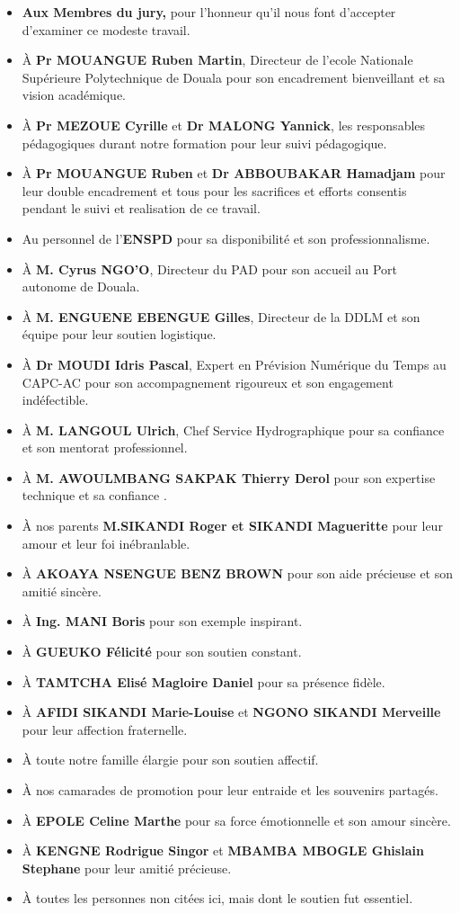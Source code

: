 \documentclass[a4paper,12pt,openany]{report}
\begin{document}
  \begin{itemize}
   
	\item \textbf{Aux Membres du jury,} pour l'honneur qu'il nous font d'accepter d'examiner ce modeste travail.  
	\item À \textbf{Pr MOUANGUE Ruben Martin}, Directeur de l'ecole Nationale Supérieure Polytechnique de Douala pour son encadrement bienveillant et sa vision académique.  
	\item À \textbf{Pr MEZOUE Cyrille} et \textbf{Dr MALONG Yannick}, les responsables pédagogiques durant notre formation pour  leur suivi pédagogique. 
	\item À \textbf{Pr MOUANGUE Ruben } et \textbf{Dr ABBOUBAKAR Hamadjam} pour leur double encadrement et tous pour les sacrifices et efforts consentis pendant le suivi et realisation  de ce travail. 
	\item Au personnel de l’\textbf{ENSPD} pour sa disponibilité et son professionnalisme.  
	\item À \textbf{M. Cyrus NGO’O}, Directeur du PAD pour son accueil au Port autonome de Douala.  
	\item À \textbf{M. ENGUENE EBENGUE Gilles}, Directeur de la DDLM et son équipe pour leur soutien logistique.  
	\item À \textbf{Dr MOUDI Idris Pascal}, Expert en Prévision Numérique du Temps au CAPC-AC  pour son accompagnement rigoureux et son engagement indéfectible.
	\item À \textbf{M. LANGOUL Ulrich}, Chef Service Hydrographique pour sa confiance et son mentorat professionnel.  
	\item À \textbf{M. AWOULMBANG SAKPAK Thierry Derol} pour son expertise technique et sa confiance .  
	\item À nos parents\textbf{ M.SIKANDI Roger et SIKANDI Magueritte} pour leur amour et leur foi inébranlable.
	 \item À \textbf{AKOAYA NSENGUE BENZ BROWN} pour son aide précieuse et son amitié sincère.    
	\item À \textbf{Ing. MANI Boris} pour son exemple inspirant.  
	\item À \textbf{GUEUKO Félicité} pour son soutien constant.  
	\item À \textbf{TAMTCHA Elisé Magloire Daniel} pour sa présence fidèle.  
	\item À \textbf{AFIDI SIKANDI Marie-Louise} et \textbf{NGONO SIKANDI Merveille} pour leur affection fraternelle.  
	\item À toute notre famille élargie pour son soutien affectif.  
	\item À nos camarades de promotion pour leur entraide et les souvenirs partagés.  
	\item À \textbf{EPOLE Celine Marthe} pour sa force émotionnelle et son amour sincère.  
	\item À  \textbf{KENGNE Rodrigue Singor} et \textbf{MBAMBA MBOGLE Ghislain Stephane} pour leur amitié précieuse.  
	\item À toutes les personnes non citées ici, mais dont le soutien fut essentiel.  
\end{itemize}
\end{document}
